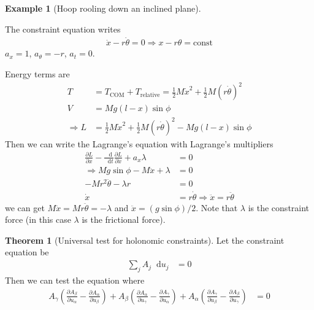 \documentclass[twoside,9pt]{article}
\numberwithin{equation}{section} %
\newcommand{\lms}{\fontfamily{lmss}\selectfont} %
\renewcommand*\d{\mathop{}\!\mathrm{d}}
\theoremstyle{definition}
\newtheorem{theorem}{\lms Theorem}[section]
\newtheorem{example}{\lms Example}[section]
\theoremstyle{remark}
\begin{document}
\begin{example}[Hoop rooling down an inclined plane]\
\tikzexternalenable
\begin{figure}[H]
    \centering
\end{figure}
\tikzexternaldisable
The constraint equation writes
\begin{align*}
    \dot{x} - r\dot{\theta} = 0
    \Rightarrow x - r\theta = \text{const}
\end{align*}
$a_x=1$, $a_\theta = -r$, $a_t=0$.

Energy terms are
\begin{align*}
    T &= 
    T_\text{COM} + T_\text{relative}
    = \frac{1}{2}M\dot{x}^2 + \frac{1}{2}M(r\dot{\theta})^2\\
    V &= Mg(l-x)\sin\phi\\
    \Rightarrow
    L &=  \frac{1}{2}M\dot{x}^2 + \frac{1}{2}M(r\dot{\theta})^2
    - Mg(l-x)\sin\phi
\end{align*}
Then we can write the Lagrange's equation with Lagrange's multipliers
\begin{align*}
    \frac{\partial L}{\partial x} - \frac{\d }{\d t}\frac{\partial L}{\partial \dot{x}}
    + a_x\lambda &= 0\\
    \Rightarrow
    Mg\sin\phi - M\ddot{x} + \lambda &= 0\\
    -Mr^2\ddot{\theta} - \lambda r &= 0\\
    \dot{x} &= r\dot{\theta}\Rightarrow
    \ddot{x} = r\ddot{\theta}
\end{align*}
we can get $M\ddot{x} = Mr\ddot{\theta} = -\lambda$ and 
$\ddot{x} = (g\sin\phi)/2$.
Note that $\lambda$ is the constraint force (in this case $\lambda$
is the frictional force).
\end{example}

\begin{theorem}[Universal test for holonomic constraints]
Let the constraint equation be
\begin{align}
    \sum_j A_j\d u_j &= 0
\end{align}
Then we can test the equation where
\begin{align}
    A_\gamma\left(\frac{\partial A_\beta}{\partial u_\alpha}
        - \frac{\partial A_\alpha}{\partial u_\beta}\right) +
    A_\beta\left(\frac{\partial A_\alpha}{\partial u_\gamma}
        - \frac{\partial A_\gamma}{\partial u_\alpha}\right) +
    A_\alpha\left(\frac{\partial A_\gamma}{\partial u_\beta}
        - \frac{\partial A_\beta}{\partial u_\gamma}\right)
        &= 0
\end{align}
\end{theorem}
\end{document}

